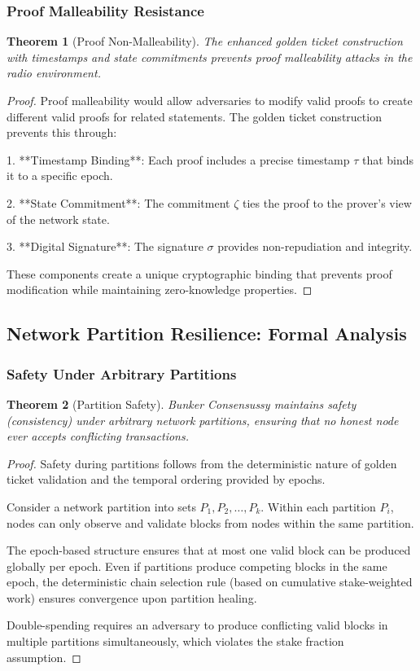 \documentclass[11pt,a4paper]{article}
\newtheorem{theorem}{Theorem}[section]
\begin{document}
\subsubsection{Proof Malleability Resistance}

\begin{theorem}[Proof Non-Malleability]
The enhanced golden ticket construction with timestamps and state commitments prevents proof malleability attacks in the radio environment.
\end{theorem}

\begin{proof}
Proof malleability would allow adversaries to modify valid proofs to create different valid proofs for related statements. The golden ticket construction prevents this through:

1. **Timestamp Binding**: Each proof includes a precise timestamp $\tau$ that binds it to a specific epoch.

2. **State Commitment**: The commitment $\zeta$ ties the proof to the prover's view of the network state.

3. **Digital Signature**: The signature $\sigma$ provides non-repudiation and integrity.

These components create a unique cryptographic binding that prevents proof modification while maintaining zero-knowledge properties.
\end{proof}

\subsection{Network Partition Resilience: Formal Analysis}

\subsubsection{Safety Under Arbitrary Partitions}

\begin{theorem}[Partition Safety]
Bunker Consensussy maintains safety (consistency) under arbitrary network partitions, ensuring that no honest node ever accepts conflicting transactions.
\end{theorem}

\begin{proof}
Safety during partitions follows from the deterministic nature of golden ticket validation and the temporal ordering provided by epochs.

Consider a network partition into sets $P_1, P_2, \ldots, P_k$. Within each partition $P_i$, nodes can only observe and validate blocks from nodes within the same partition.

The epoch-based structure ensures that at most one valid block can be produced globally per epoch. Even if partitions produce competing blocks in the same epoch, the deterministic chain selection rule (based on cumulative stake-weighted work) ensures convergence upon partition healing.

Double-spending requires an adversary to produce conflicting valid blocks in multiple partitions simultaneously, which violates the stake fraction assumption.
\end{proof}
\end{document}
